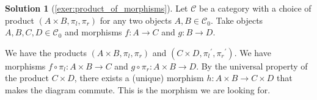 \documentclass[a4paper,11pt, oneside,titlepage=false]{scrbook}
\theoremstyle{plain}
\theoremstyle{definition}
\newtheorem{solution}[thm]{Solution}
\newcommand{\Cat}[1]{\mathcal{#1}}
\newcommand{\CC}{\Cat{C}}
\newcommand{\Ob}[1]{{#1}_0}
\newcommand{\projl}{\ensuremath{\pi_l}}
\newcommand{\projr}{\ensuremath{\pi_r}}
\begin{document}
\begin{solution}[\cref{exer:product_of_morphisms}]\label{sol:product_of_morphisms}
	Let $\CC$ be a category with a choice of product $(A\times B, \projl, \projr)$ for any two objects $A,B\in \Ob{\CC}$. Take objects $ A, B, C, D \in \Ob \CC $ and morphisms $ f: A \to C $ and $ g: B \to D $.

	\begin{center}
	\end{center}

	We have the products $ (A \times B, \projl, \projr) $ and $ (C \times D, \projl^\prime, \projr^\prime) $. We have morphisms $ f \circ \projl: A \times B \to C $ and $ g \circ \projr: A \times B \to D $. By the universal property of the product $ C \times D $, there exists a (unique) morphism $ h: A \times B \to C \times D $ that makes the diagram commute. This is the morphism we are looking for.
\end{solution}
\end{document}
